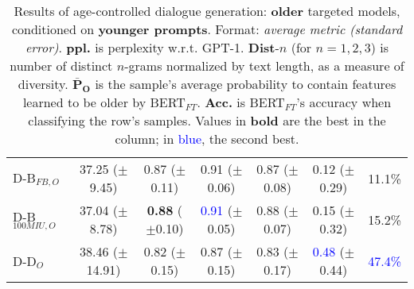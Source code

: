 \begin{table*}[h!]
{\begin{tabular}{l | c c c c | c c}
    \midrule
    D-B$_{FB, O}$ & 37.25 ($\pm$9.45) & 0.87 ($\pm$0.11) & 0.91 ($\pm$0.06) & 0.87 ($\pm$0.08) & 0.12 ($\pm$0.29) & 11.1\%\\
    D-B$_{100MIU, O}$ & 37.04 ($\pm$8.78) & \textbf{0.88} ($\pm$0.10) & \textcolor{blue}{0.91} ($\pm$0.05) & 0.88 ($\pm$0.07) & 0.15 ($\pm$0.32) & 15.2\%\\
    \midrule
    D-D$_{O}$ & 38.46 ($\pm$14.91) & 0.82 ($\pm$0.15) & 0.87 ($\pm$0.15) & 0.83 ($\pm$0.17) & \textcolor{blue}{0.48} ($\pm$0.44) & \textcolor{blue}{47.4\%}\\
    \bottomrule
    \end{tabular}
    }
    \caption{Results of age-controlled dialogue generation: \textbf{older} targeted models, conditioned on \textbf{younger prompts}. Format: \textit{average metric (standard error)}. \textbf{ppl.} is perplexity w.r.t. GPT-1. \textbf{Dist}-$n$ (for $n = 1, 2, 3$) is number of distinct $n$-grams normalized by text length, as a measure of diversity. $\boldsymbol{\bar{P}_O}$ is the sample's average probability to contain features learned to be older by BERT$_{FT}$. \textbf{Acc.} is BERT$_{FT}$'s accuracy when classifying the row's samples. Values in \textbf{bold} are the best in the column; in \textcolor{blue}{blue}, the second best.}
    \label{tab:ctg_results_ws_young_prompt_old_model}
\end{table*}

